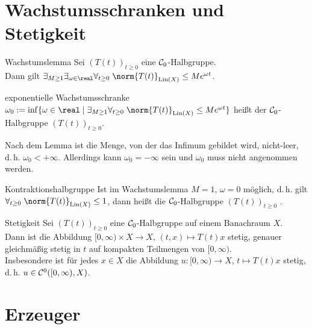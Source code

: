 \section{%
    Wachstumsschranken und Stetigkeit%
}

\begin{Lemma}{Wachstumslemma}
    Sei $(T(t))_{t \ge 0}$ eine $\mathcal{C}_0$-Halbgruppe.\\
    Dann gilt $\exists_{M \ge 1} \exists_{\omega \in \real} \forall_{t \ge 0}\;
    \norm{T(t)}_{\Lin(X)} \le Me^{\omega t}$.
\end{Lemma}

\begin{Def}{exponentielle Wachstumsschranke}
    $\omega_0 := \inf\{\omega \in \real \;|\; \exists_{M \ge 1} \forall_{t \ge 0}\;
    \norm{T(t)}_{\Lin(X)} \le Me^{\omega t}\}$ heißt 
    der $\mathcal{C}_0$-Halbgruppe $(T(t))_{t \ge 0}$.
\end{Def}

\begin{Bem}
    Nach dem Lemma ist die Menge, von der das Infimum gebildet wird, nicht-leer,
    d.\,h. $\omega_0 < +\infty$.
    Allerdings kann $\omega_0 = -\infty$ sein und $\omega_0$ muss nicht angenommen werden.
\end{Bem}

\begin{Def}{Kontraktionshalbgruppe}
    Ist im Wachstumslemma $M = 1$, $\omega = 0$ möglich,
    d.\,h. gilt $\forall_{t \ge 0}\; \norm{T(t)}_{\Lin(X)} \le 1$,
    dann heißt die $\mathcal{C}_0$-Halbgruppe $(T(t))_{t \ge 0}$ .
\end{Def}

\linie

\begin{Lemma}{Stetigkeit}
    Sei $(T(t))_{t \ge 0}$ eine $\mathcal{C}_0$-Halbgruppe auf einem Banachraum $X$.\\
    Dann ist die Abbildung $[0, \infty) \times X \to X$, $(t, x) \mapsto T(t) x$
    stetig, genauer gleichmäßig stetig in $t$ auf kompakten Teilmengen von $[0, \infty)$.\\
    Insbesondere ist für jedes $x \in X$ die Abbildung
    $u\colon [0, \infty) \to X$, $t \mapsto T(t) x$ stetig,\\
    d.\,h. $u \in \mathcal{C}^0([0, \infty), X)$.
\end{Lemma}

\pagebreak

\section{%
    Erzeuger%
}

